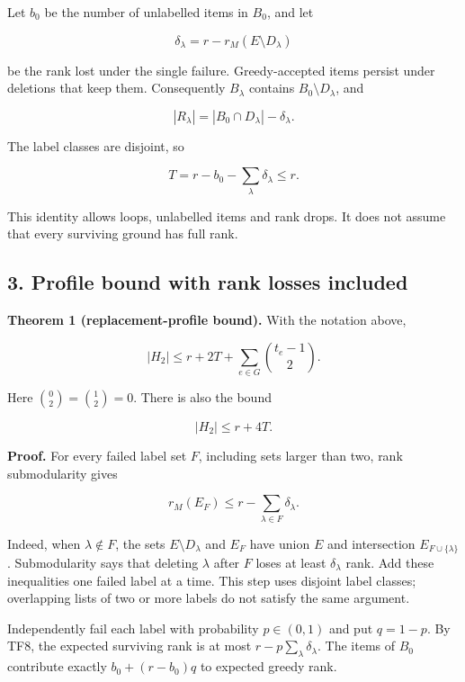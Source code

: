 Let \(b_0\) be the number of unlabelled items in \(B_0\), and let

\[
\delta_\lambda=r-r_M(E\setminus D_\lambda)
\tag{TF4}
\]

be the rank lost under the single failure. Greedy-accepted items persist under deletions that keep them. Consequently \(B_\lambda\) contains \(B_0\setminus D_\lambda\), and

\[
|R_\lambda|=|B_0\cap D_\lambda|-\delta_\lambda.
\]

The label classes are disjoint, so

\[
T=r-b_0-\sum_\lambda\delta_\lambda\le r.
\tag{TF5}
\]

This identity allows loops, unlabelled items and rank drops. It does not assume that every surviving ground has full rank.

\hypertarget{af-0a3ce40617-profile-bound-with-rank-losses-included}{%
\subsection{3. Profile bound with rank losses included}\label{af-0a3ce40617-profile-bound-with-rank-losses-included}}

\textbf{Theorem 1 (replacement-profile bound).} With the notation above,

\[
\boxed{
|H_2|\le r+2T+
\sum_{e\in G}\binom{t_e-1}{2}.}
\tag{TF6}
\]

Here \(\binom{0}{2}=\binom{1}{2}=0\). There is also the bound

\[
|H_2|\le r+4T.
\tag{TF7}
\]

\textbf{Proof.} For every failed label set \(F\), including sets larger than two, rank submodularity gives

\[
r_M(E_F)\le r-\sum_{\lambda\in F}\delta_\lambda.
\tag{TF8}
\]

Indeed, when \(\lambda\notin F\), the sets \(E\setminus D_\lambda\) and \(E_F\) have union \(E\) and intersection \(E_{F\cup\{\lambda\}}\). Submodularity says that deleting \(\lambda\) after \(F\) loses at least \(\delta_\lambda\) rank. Add these inequalities one failed label at a time. This step uses disjoint label classes; overlapping lists of two or more labels do not satisfy the same argument.

Independently fail each label with probability \(p\in(0,1)\) and put \(q=1-p\). By TF8, the expected surviving rank is at most \(r-p\sum_\lambda\delta_\lambda\). The items of \(B_0\) contribute exactly \(b_0+(r-b_0)q\) to expected greedy rank.

